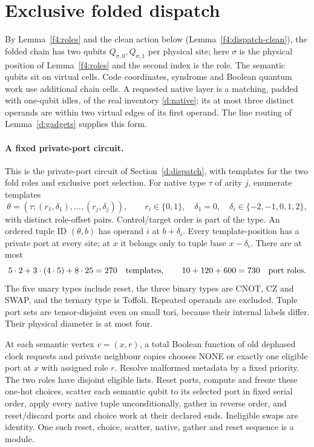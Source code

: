 \section{Exclusive folded dispatch}\label{app:f4-dispatch}
By Lemma~\ref{f4:roles} and the clean action below (Lemma~\ref{f4:dispatch-clean}), the folded chain has two
qubits \(Q_{\sigma,0},Q_{\sigma,1}\) per physical site; here \(\sigma\) is the physical position of Lemma~\ref{f4:roles} and the second index is the role. The semantic qubits sit on virtual cells. Code coordinates, syndrome and Boolean quantum work use
additional chain cells. A requested native layer is a matching, padded
with one-qubit idles, of the real inventory \eqref{d:native}; its at
most three distinct operands are within two virtual edges of its first
operand. The line routing of Lemma~\ref{d:gadgets} supplies this form.

\paragraph{A fixed private-port circuit.}
This is the private-port circuit of Section~\ref{d:dispatch}, with
templates for the two fold roles and exclusive port selection.
For native type \(\tau\) of arity \(j\), enumerate templates
\[
 \theta=(\tau;(r_1,\delta_1),\ldots,(r_j,\delta_j)),\qquad
 r_i\in\{0,1\},\quad\delta_1=0,\quad\delta_i\in\{-2,-1,0,1,2\},
\]
with distinct role-offset pairs. Control/target order is part of the
type. An ordered tuple ID \((\theta,b)\) has operand \(i\) at
\(b+\delta_i\). Every template-position has a private port at every
site; at \(x\) it belongs only to tuple base \(x-\delta_i\).
There are at most
\[
 5\cdot2+3\cdot(4\cdot5)+8\cdot25=270
 \quad\hbox{templates},\qquad 10+120+600=730
 \quad\hbox{port roles}.
\]
The five unary types include reset, the three binary types are CNOT,
CZ and SWAP, and the ternary type is Toffoli. Repeated operands are
excluded. Tuple port sets are tensor-disjoint even on small tori,
because their internal labels differ. Their physical diameter is at
most four.

At each semantic vertex \(v=(x,r)\), a total Boolean function of
old dephased clock requests and private neighbour copies chooses
NONE or exactly one eligible port at \(x\) with assigned role \(r\).
Resolve malformed metadata by a fixed priority. The two roles have
disjoint eligible lists. Reset ports, compute and freeze these one-hot
choices, scatter each semantic qubit to its selected port in fixed
serial order, apply every native tuple unconditionally, gather in
reverse order, and reset/discard ports and choice work at their declared
ends. Ineligible swaps are identity. One such reset, choice, scatter, native,
gather and reset sequence is a module.

